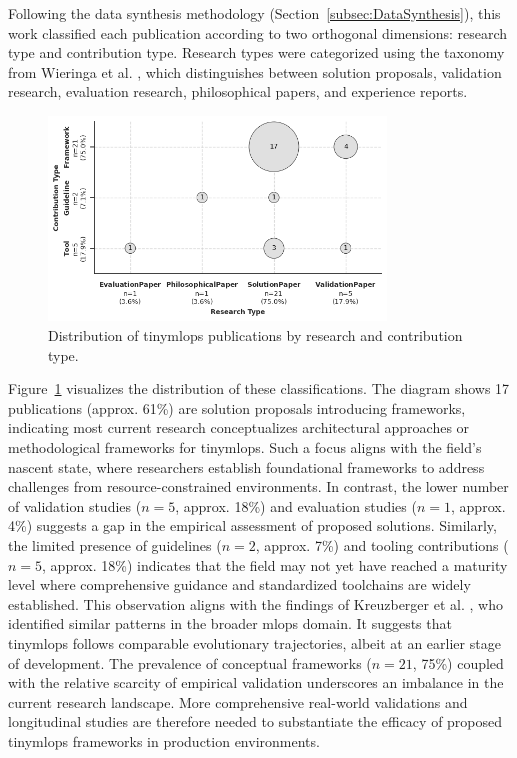 Following the data synthesis methodology (Section~\ref{subsec:DataSynthesis}), this work classified each publication according to two orthogonal dimensions: research type and contribution type. Research types were categorized using the taxonomy from Wieringa et al. \cite{wieringaRequirementsEngineeringPaper2006}, which distinguishes between solution proposals, validation research, evaluation research, philosophical papers, and experience reports.

\begin{figure}[htbp]
    \centering
    \includegraphics[width=0.8\textwidth]{figs/research_results/contribution-research-type.png}
    \caption[Research and Contribution Type Distribution]{Distribution of \gls{tinymlops} publications by research and contribution type.}
    \label{fig:ResearchContribution}
\end{figure}

Figure~\ref{fig:ResearchContribution} visualizes the distribution of these classifications. The diagram shows 17 publications (approx. 61\%) are solution proposals introducing frameworks, indicating most current research conceptualizes architectural approaches or methodological frameworks for \gls{tinymlops}. Such a focus aligns with the field's nascent state, where researchers establish foundational frameworks to address challenges from resource-constrained environments. In contrast, the lower number of validation studies ($n=5$, approx. 18\%) and evaluation studies ($n=1$, approx. 4\%) suggests a gap in the empirical assessment of proposed solutions. Similarly, the limited presence of guidelines ($n=2$, approx. 7\%) and tooling contributions ($n=5$, approx. 18\%) indicates that the field may not yet have reached a maturity level where comprehensive guidance and standardized toolchains are widely established. This observation aligns with the findings of Kreuzberger et al. \cite{kreuzbergerMachineLearningOperations2023}, who identified similar patterns in the broader \gls{mlops} domain. It suggests that \gls{tinymlops} follows comparable evolutionary trajectories, albeit at an earlier stage of development.
The prevalence of conceptual frameworks ($n=21$, 75\%) coupled with the relative scarcity of empirical validation underscores an imbalance in the current research landscape. More comprehensive real-world validations and longitudinal studies are therefore needed to substantiate the efficacy of proposed \gls{tinymlops} frameworks in production environments.

